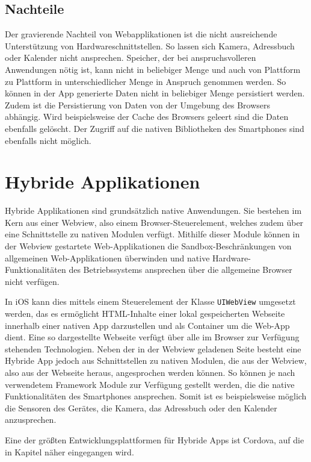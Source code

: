\subsection{Nachteile}
%
Der gravierende Nachteil von Webapplikationen ist die nicht ausreichende Unterstützung von Hardwareschnittstellen. So lassen sich Kamera, Adressbuch oder Kalender nicht ansprechen. Speicher, der bei anspruchsvolleren Anwendungen nötig ist, kann nicht in beliebiger Menge und auch von Plattform zu Plattform in unterschiedlicher Menge in Anspruch genommen werden. So können in der App generierte Daten nicht in beliebiger Menge persistiert werden. Zudem ist die Persistierung von Daten von der Umgebung des Browsers abhängig. Wird beispielsweise der Cache des Browsers geleert sind die Daten ebenfalls gelöscht. Der Zugriff auf die nativen Bibliotheken des Smartphones sind ebenfalls nicht möglich.
%
%
\section{Hybride Applikationen}
\label{sec:HybrideApplikationen}
%
Hybride Applikationen sind grundsätzlich native Anwendungen. Sie bestehen im Kern aus einer Webview, also einem Browser-Steuerelement, welches zudem über eine Schnittstelle zu nativen Modulen verfügt. Mithilfe dieser Module können in der Webview gestartete Web-Applikationen die Sandbox-Beschränkungen von allgemeinen Web-Applikationen überwinden und native Hardware-Funktionalitäten des Betriebssystems ansprechen über die allgemeine Browser nicht verfügen.

In iOS kann dies mittels einem Steuerelement der Klasse \texttt{UIWebView} \cite{uiWebView} umgesetzt werden, das es ermöglicht HTML-Inhalte einer lokal gespeicherten Webseite innerhalb einer nativen App darzustellen und als Container um die Web-App dient. Eine so dargestellte Webseite verfügt über alle im Browser zur Verfügung stehenden Technologien. Neben der in der Webview geladenen Seite besteht eine Hybride App jedoch aus Schnittstellen zu nativen Modulen, die aus der Webview, also aus der Webseite heraus, angesprochen werden können. So können je nach verwendetem Framework Module zur Verfügung gestellt werden, die die native Funktionalitäten des Smartphones ansprechen. Somit ist es beispielsweise möglich die Sensoren des Gerätes, die Kamera, das Adressbuch oder den Kalender anzusprechen. 

Eine der größten Entwicklungsplattformen für Hybride Apps ist Cordova, auf die in Kapitel  näher eingegangen wird.

